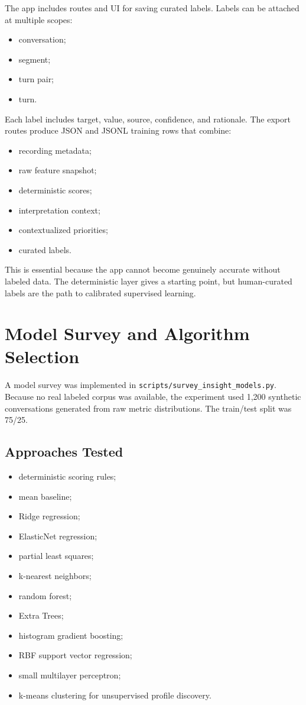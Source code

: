 \documentclass[11pt]{article}
\begin{document}
The app includes routes and UI for saving curated labels. Labels can be attached at multiple scopes:

\begin{itemize}[leftmargin=*]
  \item conversation;
  \item segment;
  \item turn pair;
  \item turn.
\end{itemize}

Each label includes target, value, source, confidence, and rationale. The export routes produce JSON and JSONL training rows that combine:

\begin{itemize}[leftmargin=*]
  \item recording metadata;
  \item raw feature snapshot;
  \item deterministic scores;
  \item interpretation context;
  \item contextualized priorities;
  \item curated labels.
\end{itemize}

This is essential because the app cannot become genuinely accurate without labeled data. The deterministic layer gives a starting point, but human-curated labels are the path to calibrated supervised learning.

\section{Model Survey and Algorithm Selection}

A model survey was implemented in \texttt{scripts/survey\_insight\_models.py}. Because no real labeled corpus was available, the experiment used 1,200 synthetic conversations generated from raw metric distributions. The train/test split was 75/25.

\subsection{Approaches Tested}

\begin{itemize}[leftmargin=*]
  \item deterministic scoring rules;
  \item mean baseline;
  \item Ridge regression;
  \item ElasticNet regression;
  \item partial least squares;
  \item k-nearest neighbors;
  \item random forest;
  \item Extra Trees;
  \item histogram gradient boosting;
  \item RBF support vector regression;
  \item small multilayer perceptron;
  \item k-means clustering for unsupervised profile discovery.
\end{itemize}
\end{document}
